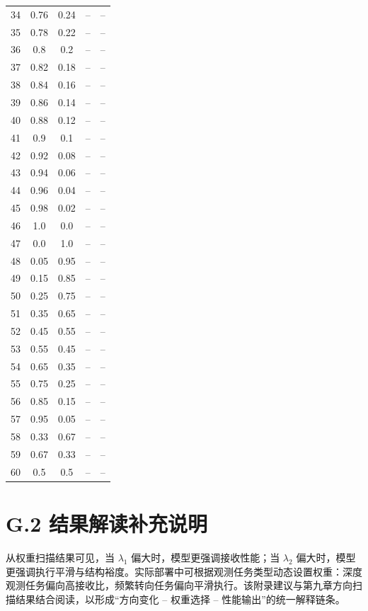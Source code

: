 \begin{longtable}{ccccc}
34&0.76&0.24&--&--\\
35&0.78&0.22&--&--\\
36&0.8&0.2&--&--\\
37&0.82&0.18&--&--\\
38&0.84&0.16&--&--\\
39&0.86&0.14&--&--\\
40&0.88&0.12&--&--\\
41&0.9&0.1&--&--\\
42&0.92&0.08&--&--\\
43&0.94&0.06&--&--\\
44&0.96&0.04&--&--\\
45&0.98&0.02&--&--\\
46&1.0&0.0&--&--\\
47&0.0&1.0&--&--\\
48&0.05&0.95&--&--\\
49&0.15&0.85&--&--\\
50&0.25&0.75&--&--\\
51&0.35&0.65&--&--\\
52&0.45&0.55&--&--\\
53&0.55&0.45&--&--\\
54&0.65&0.35&--&--\\
55&0.75&0.25&--&--\\
56&0.85&0.15&--&--\\
57&0.95&0.05&--&--\\
58&0.33&0.67&--&--\\
59&0.67&0.33&--&--\\
60&0.5&0.5&--&--\\
\bottomrule
\end{longtable}
\normalsize

\clearpage
\section*{G.2 结果解读补充说明}
从权重扫描结果可见，当 $\lambda_1$ 偏大时，模型更强调接收性能；当 $\lambda_2$ 偏大时，模型更强调执行平滑与结构裕度。实际部署中可根据观测任务类型动态设置权重：深度观测任务偏向高接收比，频繁转向任务偏向平滑执行。该附录建议与第九章方向扫描结果结合阅读，以形成“方向变化 -- 权重选择 -- 性能输出”的统一解释链条。
